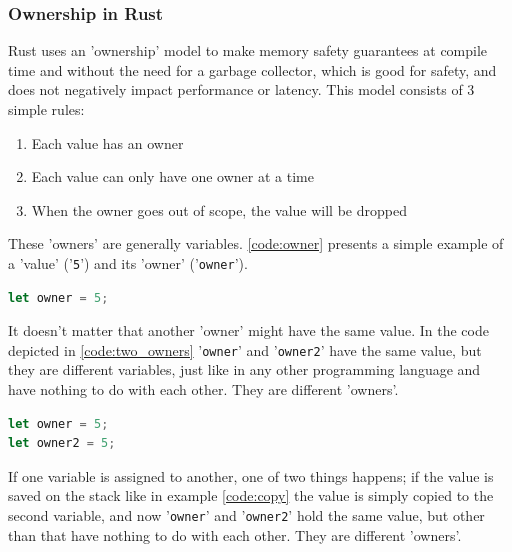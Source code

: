 \subsubsection{Ownership in Rust}

Rust uses an 'ownership' model \cite{rust_ownership} to make memory safety guarantees at compile time and without the need for a garbage collector,
which is good for safety, and does not negatively impact performance or latency.
This model consists of 3 simple rules:
\begin{enumerate}
    \item Each value has an owner
    \item Each value can only have one owner at a time
    \item When the owner goes out of scope, the value will be dropped
\end{enumerate}

These 'owners' are generally variables. \ref{code:owner} presents a simple example of a 'value' ('\lstinline{5}') and its
'owner' ('\lstinline{owner}').\\

\begin{minipage}{\textwidth}
\begin{lstlisting}[style=colorEX,language=Rust,caption={Simple example of a value and it's owner},label={code:owner}]
let owner = 5;
\end{lstlisting}
\end{minipage}

It doesn't matter that another 'owner' might have the same value. In the code depicted in \ref{code:two_owners}
'\lstinline{owner}' and '\lstinline{owner2}' have the same value, but they are different variables, just like in any
other programming language and have nothing to do with each other. They are different 'owners'.\\

\begin{minipage}{\textwidth}
\begin{lstlisting}[style=colorEX,language=Rust,caption={Simple example of two owners},label={code:two_owners}]
let owner = 5;
let owner2 = 5;
\end{lstlisting}
\end{minipage}


If one variable is assigned to another, one of two things happens; if the value is saved on the stack like in
example \ref{code:copy} the value is simply copied to the second variable, and now '\lstinline{owner}' and '\lstinline{owner2}'
hold the same value, but other than that have nothing to do with each other. They are different 'owners'.\\

